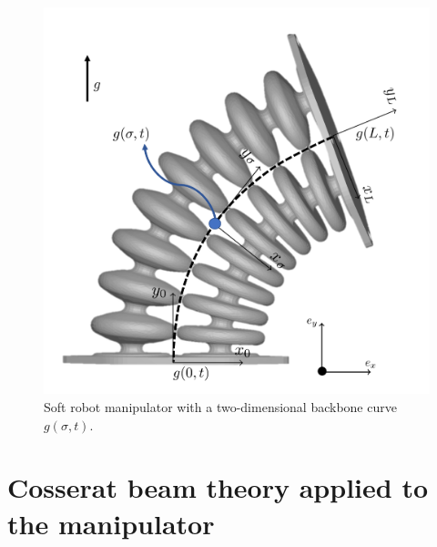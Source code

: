 \begin{figure}[H]
\begin{minipage}{.5\textwidth}
    \includegraphics[width=\textwidth]{Figures/Chapter2/actuatorschematic.png}
    \vspace{15pt}
    \caption{Soft robot manipulator with a two-dimensional backbone curve $g(\sigma,t)$.}
    \label{fig2:kinematicschematic}
\end{minipage}
\end{figure}





\section{Cosserat beam theory applied to the manipulator}

